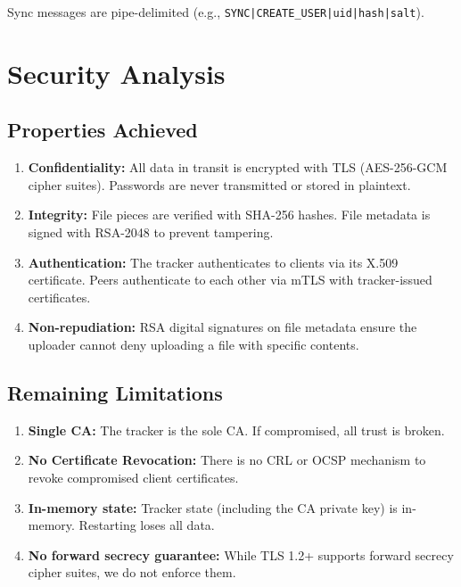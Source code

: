 \documentclass[12pt,a4paper]{article}
\begin{document}
Sync messages are pipe-delimited (e.g., \texttt{SYNC|CREATE\_USER|uid|hash|salt}).

\section{Security Analysis}

\subsection{Properties Achieved}

\begin{enumerate}
    \item \textbf{Confidentiality:} All data in transit is encrypted with TLS (AES-256-GCM cipher suites). Passwords are never transmitted or stored in plaintext.
    
    \item \textbf{Integrity:} File pieces are verified with SHA-256 hashes. File metadata is signed with RSA-2048 to prevent tampering.
    
    \item \textbf{Authentication:} The tracker authenticates to clients via its X.509 certificate. Peers authenticate to each other via mTLS with tracker-issued certificates.
    
    \item \textbf{Non-repudiation:} RSA digital signatures on file metadata ensure the uploader cannot deny uploading a file with specific contents.
\end{enumerate}

\subsection{Remaining Limitations}

\begin{enumerate}
    \item \textbf{Single CA:} The tracker is the sole CA. If compromised, all trust is broken.
    \item \textbf{No Certificate Revocation:} There is no CRL or OCSP mechanism to revoke compromised client certificates.
    \item \textbf{In-memory state:} Tracker state (including the CA private key) is in-memory. Restarting loses all data.
    \item \textbf{No forward secrecy guarantee:} While TLS 1.2+ supports forward secrecy cipher suites, we do not enforce them.
\end{enumerate}
\end{document}
